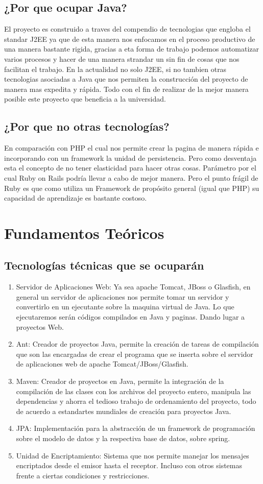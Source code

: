 \documentclass[a4paper,12pt,openany,oneside]{book}
\begin{document}
\subsection{¿Por que ocupar Java?}
El proyecto es construido a traves del compendio de tecnologias que engloba el standar J2EE ya que de esta manera nos enfocamos en el proceso productivo de una manera bastante rigida, gracias a eta forma de trabajo podemos automatizar varios procesos y hacer de una manera strandar un sin fin de cosas que nos facilitan el trabajo. En la actualidad no solo J2EE, si no tambien otras tecnologias asociadas a Java que nos permiten la construcción del proyecto de manera mas expedita y rápida. Todo con el fin de realizar de la mejor manera posible este proyecto que beneficia a la universidad.
\subsection{¿Por que no otras tecnologías?}
En comparación con PHP el cual nos permite crear la pagina de manera rápida e incorporando con un framework la unidad de persistencia. Pero como desventaja esta el concepto de no tener elasticidad para hacer otras cosas. Parámetro por el cual Ruby on Rails podría llevar a cabo de mejor manera. Pero el punto frágil de Ruby es que como utiliza un Framework de propósito general (igual que PHP) su capacidad de aprendizaje es bastante costoso. 
\section{Fundamentos Teóricos}
\subsection{Tecnologías técnicas que se ocuparán}
\begin{enumerate}
\item Servidor de Aplicaciones Web: Ya sea apache Tomcat, JBoss o Glasfish, en general un servidor de aplicaciones nos permite tomar un servidor y convertirlo en un ejecutante sobre la maquina virtual de Java. Lo que ejecutaremos serán códigos compilados en Java y paginas. Dando lugar a proyectos Web.
\item Ant: Creador de proyectos Java, permite la creación de tareas de compilación que son las encargadas de crear el programa que se inserta sobre el servidor de aplicaciones web de apache Tomcat/JBoss/Glasfish.
\item Maven: Creador de proyectos en Java, permite la integración de la compilación de las clases con los archivos del proyecto entero, manipula las dependencias y ahorra el tedioso trabajo de ordenamiento del proyecto, todo de acuerdo a estandartes mundiales de creación para proyectos Java.
\item JPA: Implementación para la abstracción de un framework de programación sobre el modelo de datos y la respectiva base de datos, sobre spring.
\item Unidad de Encriptamiento: Sistema que nos permite manejar los mensajes encriptados desde el emisor hasta el receptor. Incluso con otros sistemas frente a ciertas condiciones y restricciones.
\end{enumerate}
\end{document}
